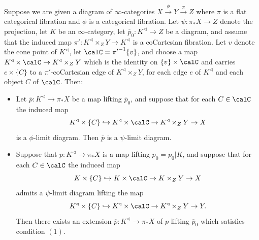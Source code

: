 \begin{proposition}\label{skitter}
Suppose we are given a diagram of $\infty$-categories $X \stackrel{\phi}{\rightarrow} Y \stackrel{\pi}{\rightarrow} Z$ where $\pi$ is a flat categorical fibration and $\phi$ is a categorical fibration.
Let $\psi: \pi_{\ast} X \rightarrow Z$ denote the projection, let $K$ be an $\infty$-category, let
$\overline{p}_0: K^{\triangleleft} \rightarrow Z$ be a diagram, and assume that the induced map
$\pi': K^{\triangleleft} \times_{Z} Y \rightarrow K^{\triangleleft}$ is a coCartesian fibration.
Let $v$ denote the cone point of $K^{\triangleleft}$, let $\calC = {\pi'}^{-1} \{v\}$, and choose
a map $K^{\triangleleft} \times \calC \rightarrow K^{\triangleleft} \times_{Z} Y$ which is the identity
on $\{v\} \times \calC$ and carries $e \times \{C\}$ to a $\pi'$-coCartesian edge of
$K^{\triangleleft} \times_{Z} Y$, for each edge $e$ of $K^{\triangleleft}$ and each object $C$ of $\calC$.
Then:
\begin{itemize}
\item[$(1)$] Let $\overline{p}: K^{\triangleleft} \rightarrow \pi_{\ast} X$ be a map lifting
$\overline{p}_0$, and suppose that for each $C \in \calC$ the induced map
$$ K^{\triangleleft} \times \{C\} \hookrightarrow
K^{\triangleleft} \times \calC \rightarrow K^{\triangleleft} \times_{Z} Y
\rightarrow X$$
is a $\phi$-limit diagram. Then $\overline{p}$ is a $\psi$-limit diagram.

\item[$(2)$] Suppose that $p: K^{\triangleleft} \rightarrow \pi_{\ast} X$ is a map lifting
$p_0 = \overline{p}_0 | K$, and suppose that for each $C \in \calC$ the induced map
$$ K \times \{C\} \hookrightarrow K \times \calC \rightarrow K \times_{Z} Y
\rightarrow X$$ admits a $\psi$-limit diagram lifting the map
$$K^{\triangleleft} \times \{C\} \hookrightarrow K^{\triangleleft} \times \calC
\rightarrow K^{\triangleleft} \times_{Z} Y \rightarrow Y.$$ 
Then there exists an extension $\overline{p}: K^{\triangleleft} \rightarrow \pi_{\ast} X$
of $p$ lifting $\overline{p}_0$ which satisfies condition $(1)$.
\end{itemize}
\end{proposition}

